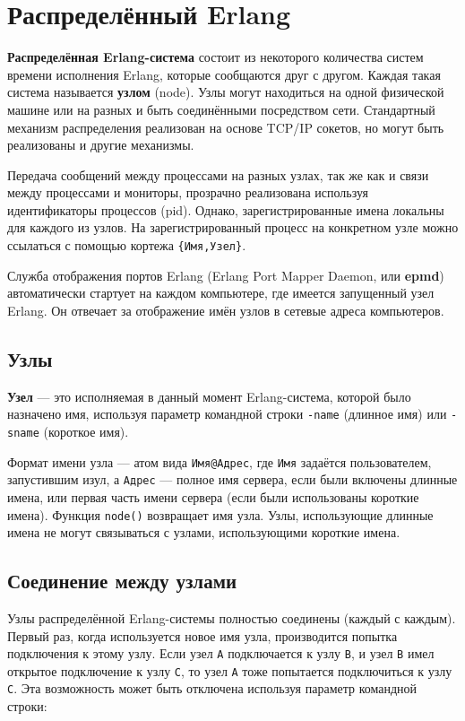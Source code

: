 \chapter{Распределённый Erlang}
\label{distribution}

\textbf{Распределённая Erlang-система} состоит из некоторого количества систем 
времени исполнения Erlang, которые сообщаются друг с другом.  Каждая такая система
называется \textbf{узлом} (node). Узлы могут находиться на одной физической машине
или на разных и быть соединёнными посредством сети.  Стандартный механизм 
распределения реализован на основе TCP/IP сокетов, но могут быть реализованы и 
другие механизмы.

Передача сообщений между процессами на разных узлах, так же как и связи между
процессами и мониторы, прозрачно реализована используя идентификаторы процессов 
(pid).  Однако, зарегистрированные имена локальны для каждого из узлов.  
На зарегистрированный процесс на конкретном узле можно ссылаться с помощью кортежа
\texttt{\{Имя,Узел\}}.

Служба отображения портов Erlang (Erlang Port Mapper Daemon, или \textbf{epmd}) 
автоматически стартует на каждом компьютере, где имеется запущенный узел Erlang.
Он отвечает за отображение имён узлов в сетевые адреса компьютеров.


\section{Узлы}

\textbf{Узел} --- это исполняемая в данный момент Erlang-система, которой было 
назначено имя, используя параметр командной строки \texttt{-name} (длинное имя)
или \texttt{-sname} (короткое имя).

Формат имени узла --- атом вида \texttt{Имя@Адрес}, где \texttt{Имя} задаётся 
пользователем, запустившим изул, а \texttt{Адрес} --- полное имя сервера, если
были включены длинные имена, или первая часть имени сервера (если были 
использованы короткие имена). Функция \texttt{node()} возвращает имя узла.  Узлы,
использующие длинные имена не могут связываться с узлами, использующими короткие
имена.


\section{Соединение между узлами}

Узлы распределённой Erlang-системы полностью соединены (каждый с каждым). Первый
раз, когда используется новое имя узла, производится попытка подключения к этому
узлу. Если узел \texttt{A} подключается к узлу \texttt{B}, и узел \texttt{B} 
имел открытое подключение к узлу \texttt{C}, то узел \texttt{А} тоже попытается
подключиться к узлу \texttt{C}.  Эта возможность может быть отключена используя
параметр командной строки:

